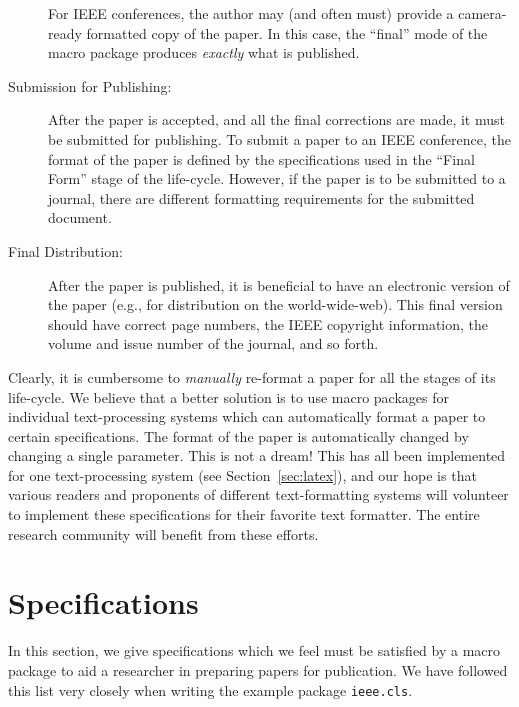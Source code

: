 \documentclass[%
	final,
	reprint,
	notitlepage,
	narroweqnarray,
	inline,
	twoside,
        invited,
	]{ieee}
\begin{document}
\begin{description}
    For IEEE conferences, the author may (and often must) provide a
    camera-ready formatted copy of the paper. In this case, the 
    ``final'' mode of the macro package produces \emph{exactly} what 
    is published.
\item[Submission for Publishing:] After the paper is accepted,
    and all the final corrections are made, it must be submitted for 
    publishing. To submit a paper to an IEEE conference, the format of 
    the paper is defined by the specifications used in the ``Final Form'' 
    stage of the life-cycle. However, if the paper is to be submitted
    to a journal, there are different formatting requirements for the
    submitted document.
\item[Final Distribution:] After the paper is published, it is
    beneficial to have an electronic version of the paper
    (e.g., for distribution on the world-wide-web). This final
    version should have correct page numbers, the IEEE copyright 
    information, the volume and issue number of the journal, and so forth.
\end{description}

Clearly, it is cumbersome to \emph{manually} re-format a paper for all
the stages of its life-cycle. We believe that a better solution is to
use macro packages for individual text-processing systems which can
automatically format a paper to certain specifications.  The format of
the paper is automatically changed by changing a single parameter.
This is not a dream! This has all been implemented for one
text-processing system (see Section~\ref{sec:latex}), and our hope is
that various readers and proponents of different text-formatting
systems will volunteer to implement these specifications for their
favorite text formatter. The entire research community will benefit
from these efforts.

\section{Specifications}

In this section, we give specifications which we feel must be
satisfied by a macro package to aid a researcher in preparing papers
for publication. We have followed this list very closely when writing
the example package \texttt{ieee.cls}.

\end{document}
